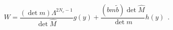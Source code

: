 \begin{equation}
  W = \frac{(\det   m)\Lambda^{2N_c-1}}{\det \hat{M}} g(y)
  + \frac{(bm\tilde{b})\det \hat{M}}{\det m} h(y)~~.
\label{undetgh}
\end{equation}

